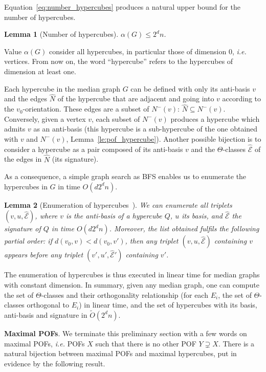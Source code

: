 \documentclass{article}
\newtheorem{lemma}{Lemma}
\begin{document}
Equation~\eqref{eq:number_hypercubes} produces a natural upper bound for the number of hypercubes.

\begin{lemma}[Number of hypercubes]
$\alpha(G)\le 2^dn$.
\label{le:number_hypercubes}
\end{lemma}

Value $\alpha(G)$ consider all hypercubes, in particular those of dimension 0, {\em i.e.} vertices. From now on, the word ``hypercube'' refers to the hypercubes of dimension at least one.

Each hypercube in the median graph $G$ can be defined with only its anti-basis $v$ and the edges $\widehat{N}$ of the hypercube that are adjacent and going into $v$ according to the $v_0$-orientation. These edges are a subset of $N^-(v)$: $\widehat{N} \subseteq N^-(v)$. Conversely, given a vertex $v$, each subset of $N^-(v)$ produces a hypercube which admits $v$ as an anti-basis (this hypercube is a sub-hypercube of the one obtained with $v$ and $N^-(v)$, Lemma~\ref{le:pof_hypercube}). Another possible bijection is to consider a hypercube as a pair composed of its anti-basis $v$ and the $\Theta$-classes $\widehat{\mathcal{E}}$ of the edges in $\widehat{N}$ (its signature).

As a consequence, a simple graph search as BFS enables us to enumerate the hypercubes in $G$ in time $O(d2^dn)$.

\begin{lemma}[Enumeration of hypercubes~\cite{BeHa21}]
We can enumerate all triplets $(v,u,\widehat{\mathcal{E}})$, where $v$ is the anti-basis of a hypercube $Q$, $u$ its basis, and $\widehat{\mathcal{E}}$ the signature of $Q$ in time $O(d2^dn)$. Moreover, the list obtained fulfils the following partial order: if $d(v_0,v) < d(v_0,v')$, then any triplet $(v,u,\widehat{\mathcal{E}})$ containing $v$ appears before any triplet $(v',u',\widehat{\mathcal{E}}')$ containing $v'$.
\label{le:enum_hypercubes}
\end{lemma}

The enumeration of hypercubes is thus executed in linear time for median graphs with constant dimension. In summary, given any median graph, one can compute the set of $\Theta$-classes and their orthogonality relationship (for each $E_i$, the set of $\Theta$-classes orthogonal to $E_i$) in linear time, and the set of hypercubes with its basis, anti-basis and signature in $\tilde{O}(2^dn)$.

\textbf{Maximal POFs}. We terminate this preliminary section with a few words on maximal POFs, {\em i.e.} POFs $X$ such that there is no other POF $Y \supsetneq X$. There is a natural bijection between maximal POFs and maximal hypercubes, put in evidence by the following result.
\end{document}
